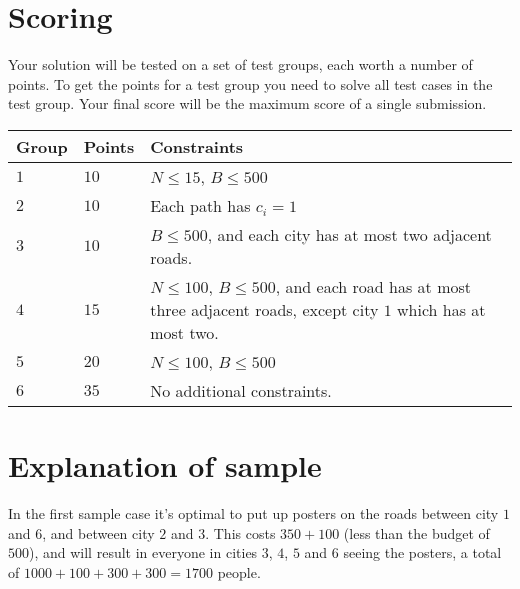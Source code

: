 \section*{Scoring}
Your solution will be tested on a set of test groups, each worth a number of points.
To get the points for a test group you need to solve all test cases in the test group. Your final score will be the maximum score of a single submission.

\noindent
\begin{tabular}{| l | l | p{10cm} |}
\hline
Group & Points & Constraints \\ \hline
$1$   & $10$         & $N \le 15$, $B \le 500$ \\ \hline
$2$   & $10$         & Each path has $c_i = 1$ \\ \hline
$3$   & $10$         & $B \le 500$, and each city has at most two adjacent roads. \\ \hline
$4$   & $15$         & $N \le 100$, $B \le 500$, and each road has at most three adjacent roads, except city $1$ which has at most two. \\ \hline
$5$   & $20$         & $N \le 100$, $B \le 500$ \\ \hline
$6$   & $35$         & No additional constraints. \\ \hline
\end{tabular}

\section*{Explanation of sample}
In the first sample case it's optimal to put up posters on the roads between city $1$ and $6$, and between city $2$ and $3$.
This costs $350 + 100$ (less than the budget of $500$), and will result in everyone in cities $3$, $4$, $5$ and $6$ seeing the posters, a total of $1000 + 100 + 300 + 300 = 1700$ people.
